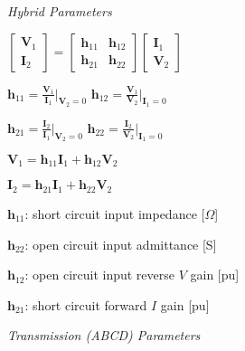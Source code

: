 \documentclass[twocolumn]{article}
\begin{document}
\textit{Hybrid Parameters}

\begin{minipage}{0.39\columnwidth}
    $\begin{bmatrix}
        \mathbf V_1 \\ \mathbf I_2
    \end{bmatrix} =
    \begin{bmatrix}
        \mathbf h_{11} & \mathbf h_{12} \\
        \mathbf h_{21} & \mathbf h_{22}
    \end{bmatrix}
    \begin{bmatrix}
        \mathbf I_1 \\ \mathbf V_2
    \end{bmatrix}$
\end{minipage}
\hfill
\begin{minipage}{0.55\columnwidth}
    $\mathbf h_{11} = \frac{\mathbf V_1}{\mathbf I_1} \bigg|_{\mathbf V_2 = 0}$ \hfill $\mathbf h_{12} = \frac{\mathbf V_1}{\mathbf V_2} \bigg|_{\mathbf I_1 = 0}$

    $\mathbf h_{21} = \frac{\mathbf I_2}{\mathbf I_1} \bigg|_{\mathbf V_2 = 0}$ \hfill $\mathbf h_{22} = \frac{\mathbf I_2}{\mathbf V_2} \bigg|_{\mathbf I_1 = 0}$
\end{minipage}

$\mathbf V_1 = \mathbf h_{11} \mathbf I_1 + \mathbf h_{12} \mathbf V_2$

$\mathbf I_2 = \mathbf h_{21} \mathbf I_1 + \mathbf h_{22} \mathbf V_2$

$\mathbf h_{11}$: short circuit input impedance [$\Omega$]

$\mathbf h_{22}$: open circuit input admittance [S]


$\mathbf h_{12}$: open circuit input reverse $V$ gain [pu]

$\mathbf h_{21}$: short circuit forward $I$ gain [pu]

\vspace{-.5em}
\dotfill

\textit{Transmission (ABCD) Parameters}
\end{document}
